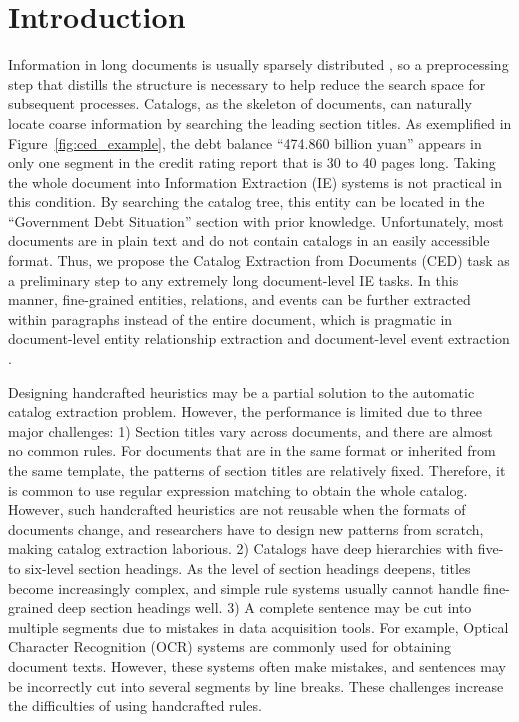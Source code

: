 \documentclass[runningheads]{llncs}
\begin{document}
 \section{Introduction}

Information in long documents is usually sparsely distributed \cite{yang-etal-2018-dcfee,zhu-et-al-ptpcg}, so a preprocessing step that distills the structure is necessary to help reduce the search space for subsequent processes.
Catalogs, as the skeleton of documents, can naturally locate coarse information by searching the leading section titles.
As exemplified in Figure~\ref{fig:ced_example}, the debt balance ``474.860 billion yuan'' appears in only one segment in the credit rating report that is 30 to 40 pages long.
Taking the whole document into Information Extraction (IE) systems is not practical in this condition.
By searching the catalog tree, this entity can be located in the ``Government Debt Situation'' section with prior knowledge.
Unfortunately, most documents are in plain text and do not contain catalogs in an easily accessible format.
Thus, we propose the Catalog Extraction from Documents (CED) task as a preliminary step to any extremely long document-level IE tasks.
In this manner, fine-grained entities, relations, and events can be further extracted within paragraphs instead of the entire document, which is pragmatic in document-level entity relationship extraction \cite{peng-etal-2017-cross,yu-etal-2020-dialogue,yao-etal-2019-docred} and document-level event extraction \cite{chen-etal-2017-automatically}.


Designing handcrafted heuristics may be a partial solution to the automatic catalog extraction problem.
However, the performance is limited due to three major challenges: 
1) Section titles vary across documents, and there are almost no common rules.
For documents that are in the same format or inherited from the same template, the patterns of section titles are relatively fixed.
Therefore, it is common to use regular expression matching to obtain the whole catalog.
However, such handcrafted heuristics are not reusable when the formats of documents change, and researchers have to design new patterns from scratch, making catalog extraction laborious.
2) Catalogs have deep hierarchies with five- to six-level section headings.
As the level of section headings deepens, titles become increasingly complex, and simple rule systems usually cannot handle fine-grained deep section headings well.
3) A complete sentence may be cut into multiple segments due to mistakes in data acquisition tools.
For example, Optical Character Recognition (OCR) systems are commonly used for obtaining document texts.
However, these systems often make mistakes, and sentences may be incorrectly cut into several segments by line breaks.
These challenges increase the difficulties of using handcrafted rules.
\end{document}
